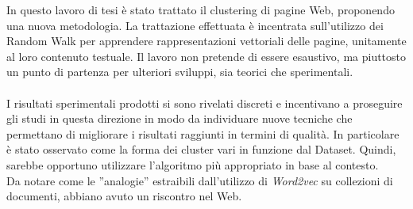 
In questo lavoro di tesi è stato trattato il clustering di pagine Web, proponendo una nuova metodologia.
La trattazione effettuata è incentrata sull'utilizzo dei Random Walk per apprendere rappresentazioni vettoriali delle pagine, unitamente al loro contenuto testuale. Il lavoro non pretende di essere esaustivo, ma piuttosto un punto di partenza per ulteriori sviluppi, sia teorici che sperimentali. 
\\\\
I risultati sperimentali prodotti si sono rivelati discreti e incentivano a proseguire gli studi in questa direzione in modo da individuare nuove tecniche che permettano di migliorare i risultati raggiunti in termini di qualità. 
In particolare è stato osservato come la forma dei cluster vari in funzione dal Dataset. Quindi, sarebbe opportuno utilizzare l'algoritmo più appropriato in base al contesto. 
\\
Da notare come le ''analogie'' estraibili dall'utilizzo di \textit{Word2vec} su collezioni di documenti, abbiano avuto un riscontro nel Web.
